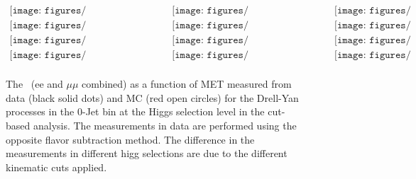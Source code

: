 \begin{figure}[!htbp]
\begin{center}$
\begin{array}{cccc}
\texttt{[image: figures/Routin\_0Jet\_mH115\_4000pb\_dy.pdf]} & 
\texttt{[image: figures/Routin\_0Jet\_mH120\_4000pb\_dy.pdf]} & 
\texttt{[image: figures/Routin\_0Jet\_mH130\_4000pb\_dy.pdf]} \\
\texttt{[image: figures/Routin\_0Jet\_mH140\_4000pb\_dy.pdf]} & 
\texttt{[image: figures/Routin\_0Jet\_mH150\_4000pb\_dy.pdf]} &
\texttt{[image: figures/Routin\_0Jet\_mH160\_4000pb\_dy.pdf]}  \\
\texttt{[image: figures/Routin\_0Jet\_mH170\_4000pb\_dy.pdf]} &
\texttt{[image: figures/Routin\_0Jet\_mH180\_4000pb\_dy.pdf]} & 
\texttt{[image: figures/Routin\_0Jet\_mH190\_4000pb\_dy.pdf]} \\
\texttt{[image: figures/Routin\_0Jet\_mH200\_4000pb\_dy.pdf]} &
\texttt{[image: figures/Routin\_0Jet\_mH250\_4000pb\_dy.pdf]} &
\texttt{[image: figures/Routin\_0Jet\_mH300\_4000pb\_dy.pdf]} \\
\end{array}$
\caption{ The \routin\, (ee and $\mu\mu$ combined) as a function of MET measured from data (black solid dots) 
and MC (red open circles) for the Drell-Yan processes in the 0-Jet bin at the 
Higgs selection level in the cut-based analysis. 
The measurements in data are performed using the opposite flavor subtraction method. 
The difference in the \routin measurements in different higg selections are due to the 
different kinematic cuts applied. 
}
\label{fig:routin_0jet}
\end{center}
\end{figure}



